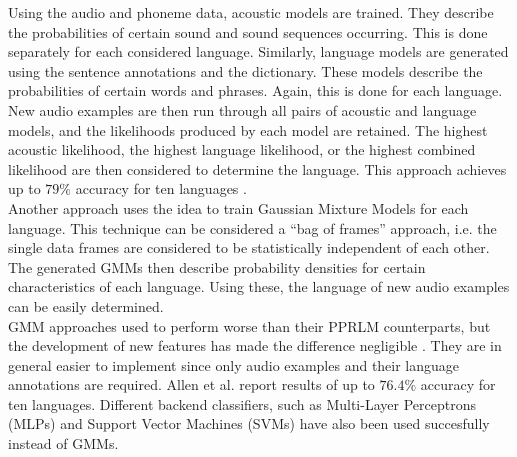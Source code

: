 Using the audio and phoneme data, acoustic models are trained. They describe the probabilities of certain sound and sound sequences occurring. This is done separately for each considered language. Similarly, language models are generated using the sentence annotations and the dictionary. These models describe the probabilities of certain words and phrases. Again, this is done for each language.\\
New audio examples are then run through all pairs of acoustic and language models, and the likelihoods produced by each model are retained. The highest acoustic likelihood, the highest language likelihood, or the highest combined likelihood are then considered to determine the language. This approach achieves up to $79\%$ accuracy for ten languages \cite{muthusamy}.\\
Another approach uses the idea to train Gaussian Mixture Models for each language. This technique can be considered a ``bag of frames'' approach, i.e. the single data frames are considered to be statistically independent of each other. The generated GMMs then describe probability densities for certain characteristics of each language. Using these, the language of new audio examples can be easily determined.\\
GMM approaches used to perform worse than their PPRLM counterparts, but the development of new features has made the difference negligible \cite{singer}. They are in general easier to implement since only audio examples and their language annotations are required. Allen et al. \cite{allen} report results of up to $76.4\%$ accuracy for ten languages. Different backend classifiers, such as Multi-Layer Perceptrons (MLPs) and Support Vector Machines (SVMs) \cite{campbell} have also been used succesfully instead of GMMs.


